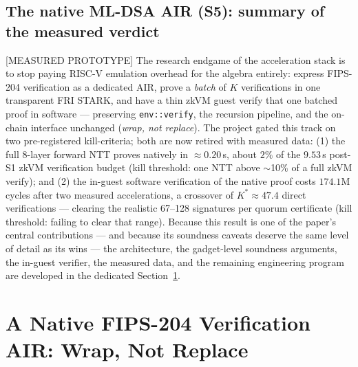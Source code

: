\documentclass[11pt]{article}
\newcommand{\code}[1]{\texttt{#1}}
\newcommand{\statusM}{\textcolor{statblue}{\textsf{\scriptsize[MEASURED PROTOTYPE]}}}
\theoremstyle{plain}
\theoremstyle{definition}
\theoremstyle{remark}
\begin{document}
\subsection{The native ML-DSA AIR (S5): summary of the measured verdict}
\label{sec:airtrack-summary}

\statusM{} The research endgame of the acceleration stack is to stop paying
RISC-V emulation overhead for the algebra entirely: express FIPS-204
verification as a dedicated AIR, prove a \emph{batch} of $K$ verifications
in one transparent FRI STARK, and have a thin zkVM guest verify that one
batched proof in software --- preserving \code{env::verify}, the recursion
pipeline, and the on-chain interface unchanged (\emph{wrap, not replace}).
The project gated this track on two pre-registered kill-criteria; both are
now retired with measured data: (1) the full 8-layer forward NTT proves
natively in $\approx 0.20$\,s, about $2\%$ of the $9.53$\,s post-S1 zkVM
verification budget (kill threshold: one NTT above $\sim$10\% of a full
zkVM verify); and (2) the in-guest software verification of the native
proof costs $174.1$M cycles after two measured accelerations, a crossover
of $K^\ast \approx 47.4$ direct verifications --- clearing the realistic
67--128 signatures per quorum certificate (kill threshold: failing to clear
that range). Because this result is one of the paper's central
contributions --- and because its soundness caveats deserve the same level
of detail as its wins --- the architecture, the gadget-level soundness
arguments, the in-guest verifier, the measured data, and the remaining
engineering program are developed in the dedicated
Section~\ref{sec:airtrack}.

\section{A Native FIPS-204 Verification AIR: Wrap, Not Replace}
\label{sec:airtrack}
\end{document}
